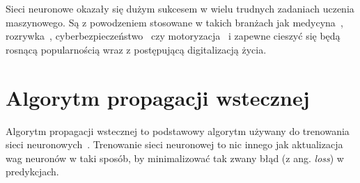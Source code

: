 Sieci neuronowe okazały się dużym sukcesem w wielu trudnych zadaniach uczenia maszynowego.
Są z powodzeniem stosowane w takich branżach jak medycyna~\cite{medicine_applications}, rozrywka~\cite{netflix_applications}, cyberbezpieczeństwo~\cite{cybersecurity_applications} czy motoryzacja~\cite{automotive_applications} i zapewne cieszyć się będą rosnącą popularnością wraz z postępującą digitalizacją życia.


\section{Algorytm propagacji wstecznej}

Algorytm propagacji wstecznej to podstawowy algorytm używany do trenowania sieci neuronowych~\cite{geron}.
Trenowanie sieci neuronowej to nic innego jak aktualizacja wag neuronów w taki sposób, by minimalizować tak zwany błąd (z ang. \textit{loss}) w predykcjach.

